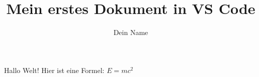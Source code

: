 \documentclass{article}
\title{Mein erstes Dokument in VS Code}
\author{Dein Name}
\begin{document}
\maketitle
Hallo Welt! Hier ist eine Formel: $E = mc^2$
\end{document}
